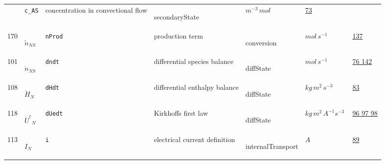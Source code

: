 \begin{longtable}{|p{1cm}|p{2.5cm}|p{4.5cm}|p{8cm}|p{3.0cm}|p{3cm}|p{1cm}|}
             & \verb|c_AS|
             & concentration in convectional flow
             & \begin{lay}secondaryState \end{lay}
             & $ m^{-3} \,mol \, $
             &                 \hyperlink{"e:73"}{ 73 }
                 \\
            170
             & \hypertarget{"v:170"}{ $ {{\tilde n}}{_{{N S}}} $}
             & \verb|nProd|
             & production term
             & \begin{lay}conversion \end{lay}
             & $ mol \,s^{-1} \, $
             &                 \hyperlink{"e:137"}{ 137 }
                 \\
            101
             & \hypertarget{"v:101"}{ $ {\dot{n}}{_{{N S}}} $}
             & \verb|dndt|
             & differential species balance
             & \begin{lay}diffState \end{lay}
             & $ mol \,s^{-1} \, $
             &                 \hyperlink{"e:76"}{ 76 }
                                 \hyperlink{"e:142"}{ 142 }
                 \\
            108
             & \hypertarget{"v:108"}{ $ {{\dot{H}}}{_{N}} $}
             & \verb|dHdt|
             & differential enthalpy balance
             & \begin{lay}diffState \end{lay}
             & $ kg \,m^{2} \,s^{-3} \, $
             &                 \hyperlink{"e:83"}{ 83 }
                 \\
            118
             & \hypertarget{"v:118"}{ $ {{\dot{U}^e}}{_{N}} $}
             & \verb|dUedt|
             & Kirkhoffs first law
             & \begin{lay}diffState \end{lay}
             & $ kg \,m^{2} \,A^{-1} s^{-3} \, $
             &                 \hyperlink{"e:96"}{ 96 }
                                 \hyperlink{"e:97"}{ 97 }
                                 \hyperlink{"e:98"}{ 98 }
                 \\
            113
             & \hypertarget{"v:113"}{ $ {I}{_{N}} $}
             & \verb|i|
             & electrical current definition
             & \begin{lay}internalTransport \end{lay}
             & $ A \, $
             &                 \hyperlink{"e:89"}{ 89 }
                 \\
    \end{longtable}